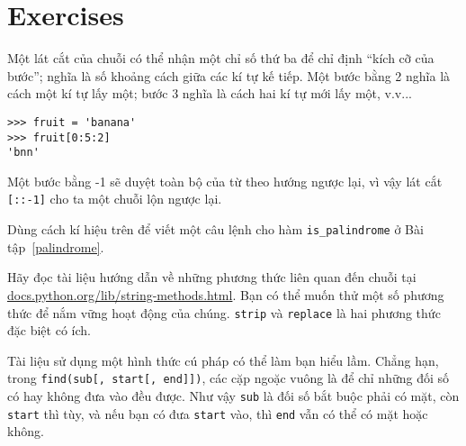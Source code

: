 \documentclass[11pt]{book}
\begin{document}
\section{Exercises}

\begin{ex}


Một lát cắt của chuỗi có thể nhận một chỉ số thứ ba để chỉ định
``kích cỡ của bước''; nghĩa là số khoảng cách giữa các kí tự kế tiếp.
Một bước bằng 2 nghĩa là cách một kí tự lấy một; bước 3 nghĩa là 
cách hai kí tự mới lấy một, v.v...

\beforeverb
\begin{verbatim}
>>> fruit = 'banana'
>>> fruit[0:5:2]
'bnn'
\end{verbatim}
\afterverb

Một bước bằng -1 sẽ duyệt toàn bộ của từ theo hướng ngược lại,
vì vậy lát cắt \verb"[::-1]" cho ta một chuỗi lộn ngược lại.


Dùng cách kí hiệu trên để viết một câu lệnh cho hàm \verb"is_palindrome"
ở Bài tập~\ref{palindrome}.
\end{ex}


\begin{ex}

Hãy đọc tài liệu hướng dẫn về những phương thức liên quan đến
chuỗi tại \url{docs.python.org/lib/string-methods.html}.  Bạn có
thể muốn thử một số phương thức để nắm vững hoạt động của chúng.
{\tt strip} và {\tt replace} là hai phương thức đặc biệt có ích.

Tài liệu sử dụng một hình thức cú pháp có thể làm bạn hiểu lầm.
Chẳng hạn, trong \verb"find(sub[, start[, end]])", các cặp ngoặc
vuông là để chỉ những đối số có hay không đưa vào đều được.
Như vậy {\tt sub} là đối số bắt buộc phải có mặt, còn
{\tt start} thì tùy, và nếu bạn có đưa {\tt start} vào, thì 
{\tt end} vẫn có thể có mặt hoặc không.
\end{ex}
\end{document}
